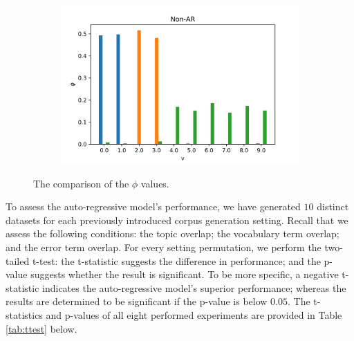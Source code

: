 \documentclass{mpaper}
\begin{document}
\begin{figure}
  \begin{subfigure}[b]{0.48\textwidth}
    \includegraphics[width=\linewidth]{phi-nonar.png}
  \end{subfigure}%
  \caption{The comparison of the $\phi$ values.}
  \label{fig:comp_phi}
\end{figure}
 
\par To assess the auto-regressive model's performance, we have generated $10$ distinct datasets for each previously introduced corpus generation setting. Recall that we assess the following conditions: the topic overlap; the vocabulary term overlap; and the error term overlap. For every setting permutation, we perform the two-tailed t-test: the t-statistic suggests the difference in performance; and the p-value suggests whether the result is significant. To be more specific, a negative t-statistic indicates the auto-regressive model's superior performance; whereas the results are determined to be significant if the p-value is below $0.05$. The t-statistics and p-values of all eight performed experiments are provided in Table \ref{tab:ttest} below.
\end{document}
